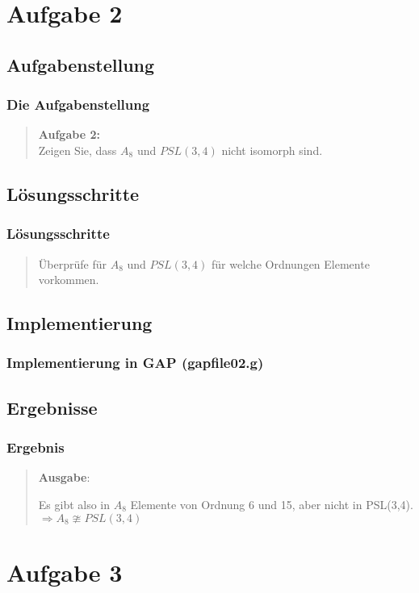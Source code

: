 \documentclass{beamer}
\begin{document}
\section{Aufgabe 2}
\subsection{Aufgabenstellung}

\begin{frame}
	\frametitle{Die Aufgabenstellung}
	\begin{quote}
	\textbf{Aufgabe 2:}\\
	Zeigen Sie, dass $A_8$ und $ PSL(3,4)$ nicht isomorph sind.
		 
	\end{quote}
\end{frame}
\subsection{Lösungsschritte}

\begin{frame}
	\frametitle{Lösungsschritte}
	\begin{quote}
	 Überprüfe für $A_8$ und $PSL(3,4)$ für welche Ordnungen Elemente vorkommen.
		 
	\end{quote}
\end{frame}
\subsection{Implementierung}

\begin{frame}
	\frametitle{Implementierung in GAP (gapfile02.g)}
	
\end{frame}
\subsection{Ergebnisse}

\begin{frame}
	\frametitle{Ergebnis}
	\begin{quote}
	  \textbf{Ausgabe}:
	  
	  Es gibt also in $A_8$ Elemente von Ordnung 6 und 15, aber nicht in PSL(3,4). 
	  $\Rightarrow  A_8 \ncong PSL(3,4)$
		  
	\end{quote}
\end{frame}


\section{Aufgabe 3}
\end{document}
